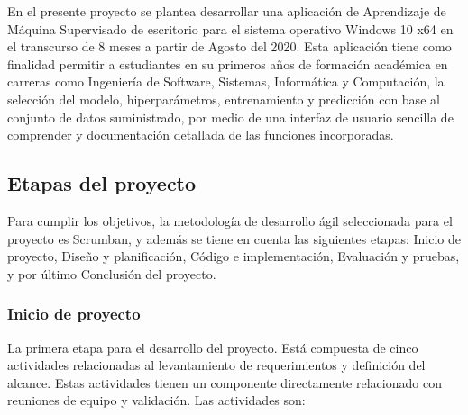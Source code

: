 En el presente proyecto se plantea desarrollar una aplicación de Aprendizaje de Máquina Supervisado de escritorio para el sistema operativo Windows 10 x64 en el transcurso de 8 meses a partir de Agosto del 2020. Esta aplicación tiene como finalidad permitir a estudiantes en su primeros años de formación académica en carreras como Ingeniería de Software, Sistemas, Informática y Computación, la selección del modelo, hiperparámetros, entrenamiento y predicción con base al conjunto de datos suministrado, por medio de una interfaz de usuario sencilla de comprender y documentación detallada de las funciones incorporadas.

\subsection{Etapas del proyecto}

Para cumplir los objetivos, la metodología de desarrollo ágil seleccionada para el proyecto es Scrumban, y además se tiene en cuenta las siguientes etapas: Inicio de proyecto, Diseño y planificación, Código e implementación, Evaluación y pruebas, y por último Conclusión del proyecto.

\subsubsection{Inicio de proyecto}
La primera etapa para el desarrollo del proyecto. Está compuesta de cinco actividades relacionadas al levantamiento de requerimientos y definición del alcance. Estas actividades tienen un componente directamente relacionado con reuniones de equipo y validación. Las actividades son:

